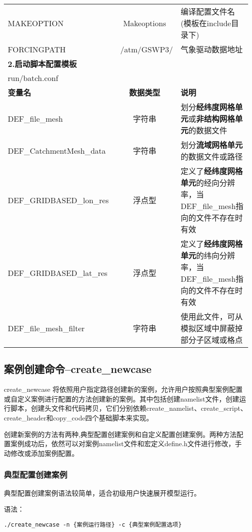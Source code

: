 \documentclass[a4paper,12pt,twoside]{article}
\begin{document}
\begin{table}[!htbp]
\begin{tabular}{lcp{}}
MAKEOPTION & Makeoptions & 编译配置文件名 (模板在include目录下) \\
FORCINGPATH & ~/atm/GSWP3/ &气象驱动数据地址 \\
\midrule
\textbf{2.启动脚本配置模板} && \\
run\slash batch.conf && \\
\textbf{变量名} & \textbf{数据类型} & \textbf{说明} \\DEF\_file\_mesh & 字符串 & 划分\textbf{经纬度网格单元}或\textbf{非结构网格单元}的数据文件 \\
DEF\_CatchmentMesh\_data & 字符串 & 划分\textbf{流域网格单元}的数据文件或路径 \\
DEF\_GRIDBASED\_lon\_res & 浮点型 & 定义了\textbf{经纬度网格单元}的经向分辨率，当DEF\_file\_mesh指向的文件不存在时有效 \\
DEF\_GRIDBASED\_lat\_res & 浮点型 & 定义了\textbf{经纬度网格单元}的纬向分辨率，当DEF\_file\_mesh指向的文件不存在时有效 \\
DEF\_file\_mesh\_filter & 字符串 & 使用此文件，可从模拟区域中屏蔽掉部分子区域或格点 \\

\bottomrule
\end{tabular} 
\end{table}



\subsection{案例创建命令--create\_newcase}
create\_newcase 将依照用户指定路径创建新的案例，允许用户按照典型案例配置或自定义案例进行配置的方法创建新的案例。其中包括创建namelist文件，创建运行脚本，创建头文件和代码拷贝，它们分别依赖create\_namelist、create\_script、create\_header和copy\_code四个基础脚本来实现。

创建新案例的方法有两种,典型配置创建案例和自定义配置创建案例。两种方法配置案例成功后，依然可以对案例namelist文件和宏定义define.h文件进行修改，手动修改或添加案例配置。

\subsubsection{典型配置创建案例}

典型配置创建案例语法较简单，适合初级用户快速展开模型运行。

语法：

\begin{lstlisting}
./create_newcase -n {案例运行路径} -c {典型案例配置选项}
\end{lstlisting}
\end{document}
